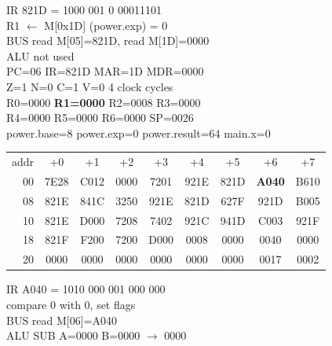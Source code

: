 \noindent\begin{tcolorbox}[stepbox, title={Step 32 \hfill PC 05 \quad LD R1, power.exp}]
\textcolor{dim}{IR} 821D = 1000 001 0 00011101\\
R1 $\leftarrow$ M[0x1D] (power.exp) = 0\\
\textcolor{dim}{BUS} read M[05]=821D, read M[1D]=0000\\
\textcolor{dim}{ALU} \textcolor{dim}{not used}\\
PC=06 IR=821D MAR=1D MDR=0000\\
Z=1 N=0 C=1 V=0 \hfill \textcolor{dim}{4 clock cycles}\\
R0=0000 \textcolor{wrt}{\textbf{R1=0000}} R2=0008 R3=0000\\
R4=0000 R5=0000 R6=0000 SP=0026\\
\textcolor{dim}{power.base=8  power.exp=0  power.result=64  main.x=0}\\[1pt]
{\setlength{\tabcolsep}{1.6pt}\begin{tabular}{@{}r*{8}{c}@{}}
\textcolor{dim}{addr} & \textcolor{dim}{+0} & \textcolor{dim}{+1} & \textcolor{dim}{+2} & \textcolor{dim}{+3} & \textcolor{dim}{+4} & \textcolor{dim}{+5} & \textcolor{dim}{+6} & \textcolor{dim}{+7}\\
\textcolor{dim}{00} & 7E28 & C012 & 0000 & 7201 & 921E & 821D & \cellcolor{pcc}\textbf{A040} & B610\\
\textcolor{dim}{08} & 821E & 841C & 3250 & 921E & 821D & 627F & 921D & B005\\
\textcolor{dim}{10} & 821E & D000 & 7208 & 7402 & 921C & 941D & C003 & 921F\\
\textcolor{dim}{18} & 821F & F200 & 7200 & D000 & \cellcolor{datac}0008 & \cellcolor{datac}0000 & \cellcolor{datac}0040 & \cellcolor{datac}0000\\
\textcolor{dim}{20} & \cellcolor{stackc}0000 & \cellcolor{stackc}0000 & \cellcolor{stackc}0000 & \cellcolor{stackc}0000 & \cellcolor{stackc}0000 & \cellcolor{stackc}0000 & \cellcolor{stackc}0017 & \cellcolor{stackc}0002\\
\end{tabular}}
\end{tcolorbox}\hfill\begin{tcolorbox}[stepbox, title={Step 33 \hfill PC 06 \quad CMP R1, R0}]
\textcolor{dim}{IR} A040 = 1010 000 001 000 000\\
compare 0 with 0, set flags\\
\textcolor{dim}{BUS} read M[06]=A040\\
\textcolor{dim}{ALU} SUB A=0000 B=0000 $\rightarrow$ 0000\\

\end{tcolorbox}
